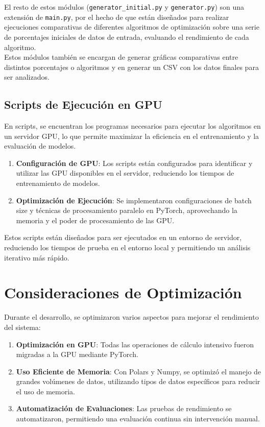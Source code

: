 El resto de estos módulos (\texttt{generator\_initial.py} y \texttt{generator.py}) son una extensión de
\texttt{main.py}, por el hecho de que están diseñados para realizar ejecuciones comparativas de diferentes algoritmos
de optimización sobre una serie de porcentajes iniciales de datos de entrada, evaluando el rendimiento de cada
algoritmo. \\[6pt]

Estos módulos también se encargan de generar gráficas comparativas entre distintos porcentajes o algoritmos y en
generar un CSV con los datos finales para ser analizados.

\subsection{Scripts de Ejecución en GPU}\label{subsec:scripts-de-ejecucion-en-gpu}
En scripts, se encuentran los programas necesarios para ejecutar los algoritmos en un servidor GPU, lo que permite
maximizar la eficiencia en el entrenamiento y la evaluación de modelos.
\begin{enumerate}
    \item \textbf{Configuración de GPU}: Los scripts están configurados para identificar y utilizar las GPU disponibles
    en el servidor, reduciendo los tiempos de entrenamiento de modelos.
    \item \textbf{Optimización de Ejecución}: Se implementaron configuraciones de batch size y técnicas de
    procesamiento paralelo en PyTorch, aprovechando la memoria y el poder de procesamiento de las GPU\@.
\end{enumerate}

Estos scripts están diseñados para ser ejecutados en un entorno de servidor, reduciendo los tiempos de prueba en el
entorno local y permitiendo un análisis iterativo más rápido.

\section{Consideraciones de Optimización}\label{sec:consideraciones-de-optimizacion}
Durante el desarrollo, se optimizaron varios aspectos para mejorar el rendimiento del sistema:

\begin{enumerate}
    \item \textbf{Optimización en GPU}: Todas las operaciones de cálculo intensivo fueron migradas a la GPU mediante
    PyTorch.
    \item \textbf{Uso Eficiente de Memoria}: Con Polars y Numpy, se optimizó el manejo de grandes volúmenes de datos,
    utilizando tipos de datos específicos para reducir el uso de memoria.
    \item \textbf{Automatización de Evaluaciones}: Las pruebas de rendimiento se automatizaron, permitiendo una
    evaluación continua sin intervención manual.
\end{enumerate}